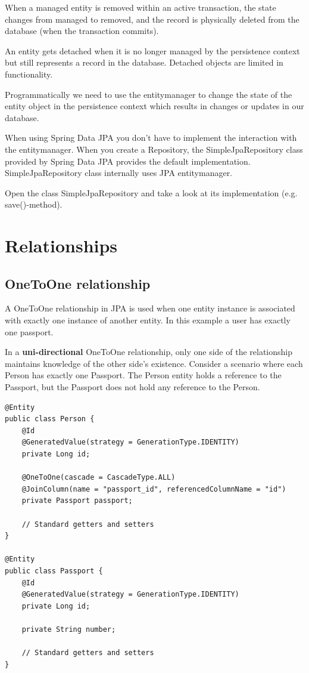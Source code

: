 When a managed entity is removed within an active transaction, the state changes from managed to removed, and the record is physically deleted from the database (when the transaction commits).

An entity gets detached when it is no longer managed by the persistence context but still represents a record in the database.
Detached objects are limited in functionality.

 
Programmatically we need to use the entitymanager to change the state of the entity object in the persistence context which results in changes or updates in our database. 

When using Spring Data JPA you don't have to implement the interaction with the entitymanager. When you create a Repository, the SimpleJpaRepository class provided by Spring Data JPA provides the default implementation. SimpleJpaRepository class internally uses JPA entitymanager.

\begin{oefening}
Open the class SimpleJpaRepository and take a look at its implementation (e.g. save()-method).
\end{oefening}


\section{Relationships}

\subsection{OneToOne relationship}

A OneToOne relationship in JPA is used when one entity instance is associated with exactly one instance of another entity.  In this example a user has exactly one passport.

In a \textbf{uni-directional} OneToOne relationship, only one side of the relationship maintains knowledge of the other side’s existence. Consider a scenario where each Person has exactly one Passport. The Person entity holds a reference to the Passport, but the Passport does not hold any reference to the Person.

\begin{lstlisting}
@Entity
public class Person {
    @Id
    @GeneratedValue(strategy = GenerationType.IDENTITY)
    private Long id;
    
    @OneToOne(cascade = CascadeType.ALL)
    @JoinColumn(name = "passport_id", referencedColumnName = "id")
    private Passport passport;

    // Standard getters and setters
}

@Entity
public class Passport {
    @Id
    @GeneratedValue(strategy = GenerationType.IDENTITY)
    private Long id;
    
    private String number;

    // Standard getters and setters
}
\end{lstlisting}

